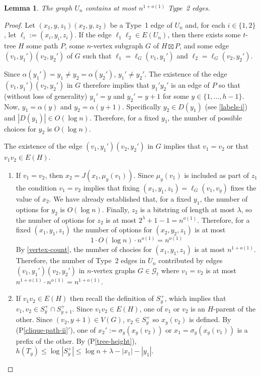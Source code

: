 \documentclass{patmorin}
\newcommand{\pref}[1]{(P\ref{#1})}
\newcommand{\psref}[1]{(P\ref{#1}$'$)}
\newtheorem{lemma}{Lemma}
\begin{document}
\begin{lemma}\label{vertical-edges}
    The graph $U_n$ contains at most $n^{1+o(1)}$ Type~2 edges.
\end{lemma}

\begin{proof}
    Let $(x_1,y,z_1)(x_2,y,z_2)$ be a Type~1 edge of $U_n$ and, for each $i\in\{1,2\}$, let $\ell_i:=(x_i,y_i,z_i)$.  If the edge $\ell_1\ell_2\in E(U_n)$, then there exists some $t$-tree $H$ some path $P$, some $n$-vertex subgraph $G$ of $H\boxtimes P$, and some edge $(v_1,y_1')(v_2,y_2')$ of $G$ such that $\ell_1=\ell_G(v_1,y_1')$ and $\ell_2=\ell_G(v_2,y_2')$.

    Since $\alpha(y_1')=y_1\neq y_2=\alpha(y_2')$, $y_1'\neq y_2'$. The existence of the edge $(v_1,y_1')(v_2,y_2')$ in $G$ therefore implies that $y_1'y_2'$ is an edge of $P$ so that (without loss of generality) $y_1'=y$ and $y_2'=y+1$ for some $y\in\{1,\ldots,h-1\}$.  Now, $y_1=\alpha(y)$ and $y_2=\alpha(y+1)$.  Specifically $y_2\in D(y_1)$ (see \cref{labels-i}) and $|D(y_1)|\in O(\log n)$.  Therefore, for a fixed $y_1$, the number of possible choices for $y_2$ is $O(\log n)$.

    The existence of the edge $(v_1,y_1')(v_2,y_2')$ in $G$ implies that $v_1=v_2$ or that $v_1v_2\in E(H)$.
    \begin{enumerate}
        \item If $v_1=v_2$, then $x_2=J(x_1,\mu_y(v_1))$.  Since $\mu_y(v_1)$ is included as part of $z_1$ the condition $v_1=v_2$ implies that fixing $(x_1,y_1,z_1)=\ell_G(v_1,v_y)$ fixes the value of $x_2$.  We have already established that, for a fixed $y_1$, the number of options for $y_2$ is $O(\log n)$.  Finally, $z_2$ is a bitstring of length at most $\lambda$, so the number of options for $z_2$ is at most $2^\lambda+1-1=n^{o(1)}$.  Therefore, for a fixed $(x_1,y_1,z_1)$ the number of options for $(x_2,y_2,z_1)$ is at most
        \[  1\cdot O(\log n) \cdot n^{o(1)} = n^{o(1)} \]
        By \cref{vertex-count}, the number of chocies for $(x_1,y_1,z_1)$ is at most $n^{1+o(1)}$.  Therefore, the number of Type~2 edges in $U_n$ contributed by edges $(v_1,y_1')(v_2,y_2')$ in $n$-vertex graphs $G\in\mathcal{G}_t$ where $v_1=v_2$ is at most $n^{1+o(1)}\cdot n^{o(1)} = n^{1+o(1)}$.

        \item If $v_1v_2\in E(H)$ then recall the definition of $S^+_y$,  which implies that $v_1,v_2\in S^+_y\cap S^+_{y+1}$.  Since $v_1v_2\in E(H)$, one of $v_1$ or $v_2$ is an $H$-parent of the other. Since $(v_2,y+1)\in V(G)$, $v_2\in S^+_y$ so $x_y(v_2)$ is defined. By \psref{clique-path-ii}, one of $x_2':=\sigma_y(x_y(v_2))$ or $x_1=\sigma_y(x_y(v_1))$ is a prefix of the other.  By \pref{tree-height}, $h(T_y)\le \log|S^+_y|\le\log n+\lambda -|x_1|-|y_1|$.


\end{enumerate}
\end{proof}
\end{document}
